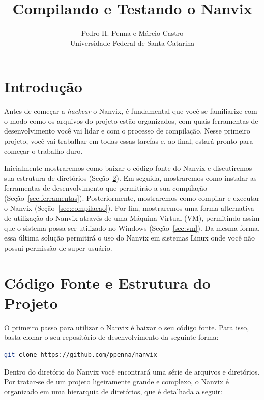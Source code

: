 \documentclass[11pt]{article}
\title{Compilando e Testando o Nanvix}
\author{Pedro H. Penna e Márcio Castro\\[0.3em]
\small Universidade Federal de Santa Catarina}
\date{}
\begin{document}
\maketitle

\noindent 


\section{Introdução}

Antes de começar a \textit{hackear} o Nanvix, é fundamental que você se familiarize com o modo como os arquivos do projeto estão organizados, com quais ferramentas de desenvolvimento você vai lidar e com o processo de compilação. Nesse primeiro projeto, você vai trabalhar em todas essas tarefas e, ao final, estará pronto para começar o trabalho duro.

Inicialmente mostraremos como baixar o código fonte do Nanvix e discutiremos sua estrutura de diretórios (Seção~\ref{sec:codigo}). Em seguida, mostraremos como instalar as ferramentas de desenvolvimento que permitirão a sua compilação (Seção~\ref{sec:ferramentas}). Posteriormente, mostraremos como compilar e executar o Nanvix (Seção~\ref{sec:compilacao}). Por fim, mostraremos uma forma alternativa de utilização do Nanvix através de uma Máquina Virtual (VM), permitindo assim que o sistema possa ser utilizado no Windows (Seção~\ref{sec:vm}). Da mesma forma, essa última solução permitirá o uso do Nanvix em sistemas Linux onde você não possui permissão de super-usuário.

\section{Código Fonte e Estrutura do Projeto}
\label{sec:codigo}
O primeiro passo para utilizar o Nanvix é baixar o seu código fonte. Para isso, basta clonar o seu repositório de desenvolvimento da seguinte forma: \\

\begin{lstlisting}[language=bash,numbers=none,frame=single]
git clone https://github.com/ppenna/nanvix
\end{lstlisting}

Dentro do diretório do Nanvix você encontrará uma série de arquivos e diretórios. Por tratar-se de um projeto ligeiramente grande e complexo, o Nanvix é organizado em uma hierarquia de diretórios, que é detalhada a seguir:
\end{document}
